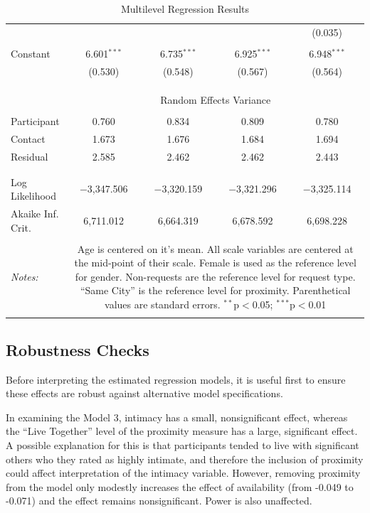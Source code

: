 \documentclass[12pt]{nuthesis}	%
\begin{document}
\begin{table}[!htbp]
\begin{tabular}{@{\extracolsep{5pt}}lcccc}
  &  &  &  & (0.035) \\ 
  & & & & \\ 
 Constant & 6.601$^{***}$ & 6.735$^{***}$ & 6.925$^{***}$ & 6.948$^{***}$ \\ 
  & (0.530) & (0.548) & (0.567) & (0.564) \\ 
  & & & & \\ 
\hline \\[-1.8ex] 
\\[-1.8ex] & \multicolumn{4}{c}{Random Effects Variance} \\ 
\hline \\[-1.8ex] 
 Participant & 0.760 & 0.834 & 0.809 & 0.780 \\
 Contact & 1.673 & 1.676 & 1.684 & 1.694 \\
 Residual & 2.585 & 2.462 & 2.462 & 2.443 \\
 \hline \\[-1.8ex] 
 \hline \\[-1.8ex] 
Log Likelihood & $-$3,347.506 & $-$3,320.159 & $-$3,321.296 & $-$3,325.114 \\ 
Akaike Inf. Crit. & 6,711.012 & 6,664.319 & 6,678.592 & 6,698.228 \\ 
\hline 
\hline \\[-1.8ex] 
\textit{Notes:}  & \multicolumn{4}{p{\dimexpr 0.55\linewidth-2\tabcolsep}}{ Age is centered on it's mean. All scale variables are centered at the mid-point of their scale. Female is used as the reference level for gender. Non-requests are the reference level for request type. ``Same City'' is the reference level for proximity. Parenthetical values are standard errors. $^{**}$p$<$0.05; $^{***}$p$<$0.01} \\ 
\\
\end{tabular} 
  \caption{Multilevel Regression Results} 
  \label{tab:fixed_effects} 
\end{table} 

\subsection{Robustness Checks}

Before interpreting the estimated regression models, it is useful first to ensure these effects are robust against alternative model specifications.

In examining the Model 3, intimacy has a small, nonsignificant effect, whereas the ``Live Together'' level of the proximity measure has a large, significant effect. A possible explanation for this is that participants tended to live with significant others who they rated as highly intimate, and therefore the inclusion of proximity could affect interpretation of the intimacy variable. However, removing proximity from the model only modestly increases the effect of availability (from -0.049 to -0.071) and the effect remains nonsignificant. Power is also unaffected.
\end{document}
